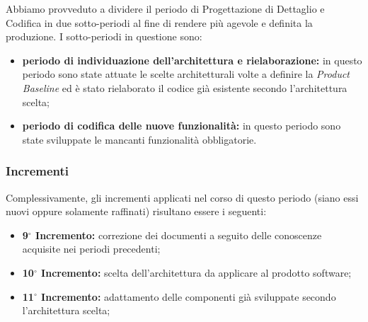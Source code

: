Abbiamo provveduto a dividere il periodo di Progettazione di Dettaglio e Codifica in due sotto-periodi al fine di rendere più agevole e definita la produzione. I sotto-periodi in questione sono:
\begin{itemize}
	\item \textbf{periodo di individuazione dell'architettura e rielaborazione:} in questo periodo sono state attuate le scelte architetturali volte a definire la \textit{Product Baseline} ed è stato rielaborato il codice già esistente secondo l'architettura scelta;
	\item \textbf{periodo di codifica delle nuove funzionalità:} in questo periodo sono state sviluppate le mancanti funzionalità obbligatorie.
\end{itemize}

\subsubsection{Incrementi}
Complessivamente, gli incrementi applicati nel corso di questo periodo (siano essi nuovi oppure solamente raffinati) risultano essere i seguenti:

\begin{itemize}
	\item \textbf{9$^{\circ}$ Incremento:} correzione dei documenti a seguito delle conoscenze acquisite nei periodi precedenti;
	\item \textbf{10$^{\circ}$ Incremento:} scelta dell'architettura da applicare al prodotto software;
	\item \textbf{11$^{\circ}$ Incremento:} adattamento delle componenti già sviluppate secondo l’architettura scelta;
\end{itemize}

